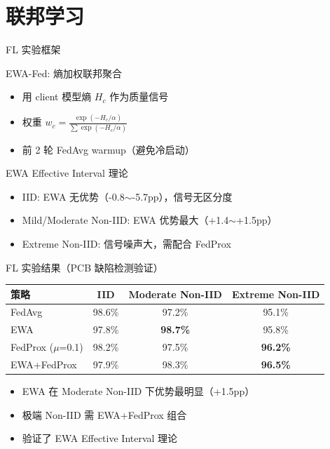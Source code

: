 \documentclass[aspectratio=169, 11pt]{beamer}
\begin{document}
\section{联邦学习}

\begin{frame}{FL 实验框架}
  \begin{block}{EWA-Fed: 熵加权联邦聚合}
    \begin{itemize}
      \item 用 client 模型熵 $H_c$ 作为质量信号
      \item 权重 $w_c = \frac{\exp(-H_c / \alpha)}{\sum \exp(-H_c / \alpha)}$
      \item 前 2 轮 FedAvg warmup（避免冷启动）
    \end{itemize}
  \end{block}
  \begin{block}{EWA Effective Interval 理论}
    \begin{itemize}
      \item IID: EWA 无优势（-0.8$\sim$-5.7pp），信号无区分度
      \item Mild/Moderate Non-IID: EWA 优势最大（+1.4$\sim$+1.5pp）
      \item Extreme Non-IID: 信号噪声大，需配合 FedProx
    \end{itemize}
  \end{block}
\end{frame}

\begin{frame}{FL 实验结果（PCB 缺陷检测验证）}
  \centering
  \begin{tabular}{lccc}
    \toprule
    策略 & IID & Moderate Non-IID & Extreme Non-IID \\
    \midrule
    FedAvg & 98.6\% & 97.2\% & 95.1\% \\
    EWA & 97.8\% & \textbf{98.7\%} & 95.8\% \\
    FedProx ($\mu$=0.1) & 98.2\% & 97.5\% & \textbf{96.2\%} \\
    EWA+FedProx & 97.9\% & 98.3\% & \textbf{96.5\%} \\
    \bottomrule
  \end{tabular}
  \vspace{0.8em}
  \begin{itemize}
    \item EWA 在 Moderate Non-IID 下优势最明显（+1.5pp）
    \item 极端 Non-IID 需 EWA+FedProx 组合
    \item 验证了 EWA Effective Interval 理论
  \end{itemize}
\end{frame}
\end{document}
